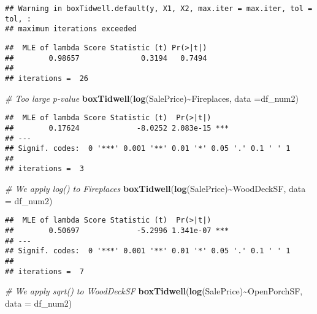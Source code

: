 \documentclass[
]{article}
\newenvironment{Shaded}{\begin{snugshade}}{\end{snugshade}}
\newcommand{\AttributeTok}[1]{\textcolor[rgb]{0.13,0.29,0.53}{#1}}
\newcommand{\CommentTok}[1]{\textcolor[rgb]{0.56,0.35,0.01}{\textit{#1}}}
\newcommand{\FunctionTok}[1]{\textcolor[rgb]{0.13,0.29,0.53}{\textbf{#1}}}
\newcommand{\NormalTok}[1]{#1}
\newcommand{\SpecialCharTok}[1]{\textcolor[rgb]{0.81,0.36,0.00}{\textbf{#1}}}
\begin{document}
\begin{verbatim}
## Warning in boxTidwell.default(y, X1, X2, max.iter = max.iter, tol = tol, :
## maximum iterations exceeded
\end{verbatim}

\begin{verbatim}
##  MLE of lambda Score Statistic (t) Pr(>|t|)
##        0.98657              0.3194   0.7494
## 
## iterations =  26
\end{verbatim}

\begin{Shaded}
\begin{Highlighting}[]
\CommentTok{\# Too large p{-}value}
\FunctionTok{boxTidwell}\NormalTok{(}\FunctionTok{log}\NormalTok{(SalePrice)}\SpecialCharTok{\textasciitilde{}}\NormalTok{Fireplaces, }\AttributeTok{data =}\NormalTok{df\_num2)}
\end{Highlighting}
\end{Shaded}

\begin{verbatim}
##  MLE of lambda Score Statistic (t)  Pr(>|t|)    
##        0.17624             -8.0252 2.083e-15 ***
## ---
## Signif. codes:  0 '***' 0.001 '**' 0.01 '*' 0.05 '.' 0.1 ' ' 1
## 
## iterations =  3
\end{verbatim}

\begin{Shaded}
\begin{Highlighting}[]
\CommentTok{\# We apply log() to Fireplaces}
\FunctionTok{boxTidwell}\NormalTok{(}\FunctionTok{log}\NormalTok{(SalePrice)}\SpecialCharTok{\textasciitilde{}}\NormalTok{WoodDeckSF, }\AttributeTok{data =}\NormalTok{ df\_num2)}
\end{Highlighting}
\end{Shaded}

\begin{verbatim}
##  MLE of lambda Score Statistic (t)  Pr(>|t|)    
##        0.50697             -5.2996 1.341e-07 ***
## ---
## Signif. codes:  0 '***' 0.001 '**' 0.01 '*' 0.05 '.' 0.1 ' ' 1
## 
## iterations =  7
\end{verbatim}

\begin{Shaded}
\begin{Highlighting}[]
\CommentTok{\# We apply sqrt() to WoodDeckSF}
\FunctionTok{boxTidwell}\NormalTok{(}\FunctionTok{log}\NormalTok{(SalePrice)}\SpecialCharTok{\textasciitilde{}}\NormalTok{OpenPorchSF, }\AttributeTok{data =}\NormalTok{ df\_num2)}
\end{Highlighting}
\end{Shaded}
\end{document}
